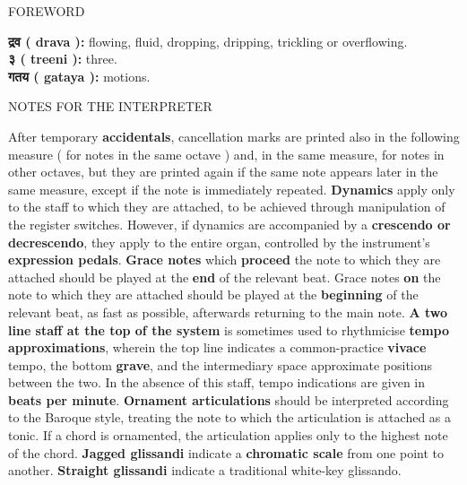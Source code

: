 \documentclass[12pt]{article}
\newcommand*\circled[1]{\tikz[baseline=(char.base)]{
            \node[shape=circle,draw,inner sep=1pt] (char) {#1};}}
\begin{document}
\vspace*{2\baselineskip}

\begingroup
\begin{center}
\huge FOREWORD
\end{center}
\endgroup

\begingroup
\begin{center}
\textbf{{\selectfont \setmainfont{Devanagari MT Bold}\selectfont द्रव} ( drava ):} flowing, fluid, dropping, dripping, trickling or overflowing. \\
\textbf{{\selectfont \setmainfont{Devanagari MT Bold}\selectfont ३} ( treeni ):} three. \\
\textbf{{\selectfont \setmainfont{Devanagari MT Bold}\selectfont गतय} ( gataya ):} motions. \\
\end{center}
\endgroup

\vspace*{4\baselineskip}

\begingroup
\begin{center}
\huge NOTES FOR THE INTERPRETER
\end{center}
\endgroup

\begingroup
\begin{center}
\textbf{\circled{1}} After temporary \textbf{accidentals}, cancellation marks are printed also in the following measure ( for notes in the same octave ) and, in the same measure, for notes in other octaves, but they are printed again if the same note appears later in the same measure, except if the note is immediately repeated. \textbf{\circled{2} Dynamics} apply only to the staff to which they are attached, to be achieved through manipulation of the register switches. However, if dynamics are accompanied by a \textbf{crescendo or decrescendo}, they apply to the entire organ, controlled by the instrument's \textbf{expression pedals}. \textbf{\circled{3} Grace notes} which \textbf{proceed} the note to which they are attached should be played at the \textbf{end} of the relevant beat. Grace notes \textbf{on} the note to which they are attached should be played at the \textbf{beginning} of the relevant beat, as fast as possible, afterwards returning to the main note. \textbf{\circled{4} A two line staff at the top of the system} is sometimes used to rhythmicise \textbf{tempo approximations}, wherein the top line indicates a common-practice \textbf{vivace} tempo, the bottom \textbf{grave}, and the intermediary space approximate positions between the two. In the absence of this staff, tempo indications are given in \textbf{beats per minute}. \textbf{\circled{5} Ornament articulations} should be interpreted according to the Baroque style, treating the note to which the articulation is attached as a tonic. If a chord is ornamented, the articulation applies only to the highest note of the chord. \textbf{\circled{6} Jagged glissandi} indicate a \textbf{chromatic scale} from one point to another. \textbf{Straight glissandi} indicate a traditional white-key glissando.
\end{center}
\endgroup
\end{document}

